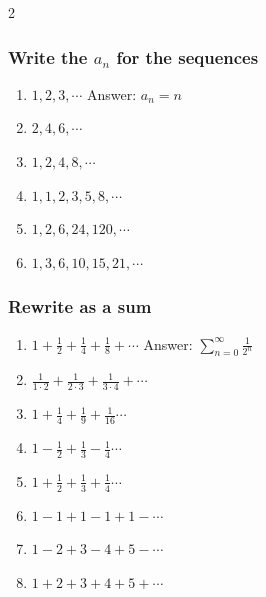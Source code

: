 \documentclass[12pt]{article}
\begin{document}
\begin{multicols}{2}
\subsubsection*{Write the  $a_n$ for the sequences}

\begin{enumerate}
    \item $ 1, 2, 3, \cdots$ Answer: $a_n = n$
    \item $2, 4, 6, \cdots$
    \item $1, 2, 4, 8, \cdots$
    \item $1,1,2,3,5,8, \cdots$
    \item $ 1,2,6,24,120,\cdots$
    \item $1,3,6,10,15,21, \cdots$
\end{enumerate}

\subsubsection*{Rewrite as a sum}

\begin{enumerate}
    \item $1+\frac{1}{2}+\frac{1}{4}+\frac{1}{8}+ \cdots$ Answer: $\sum_{n=0}^\infty\frac{1}{2^n}$
    \item $\frac{1}{1\cdot2}+\frac{1}{2\cdot3}+\frac{1}{3\cdot4}+ \cdots$
    \item $1+\frac{1}{4}+\frac{1}{9}+\frac{1}{16} \cdots$
    \item $ 1-\frac{1}{2}+\frac{1}{3}-\frac{1}{4} \cdots$
    \item $1+\frac{1}{2}+\frac{1}{3}+\frac{1}{4} \cdots$
    \item $1-1+1-1+1- \cdots$
    \item $1-2+3-4+5- \cdots$
    \item $1+2+3+4+5+ \cdots$
    
\end{enumerate}
\end{multicols}


\pagebreak
\end{document}
